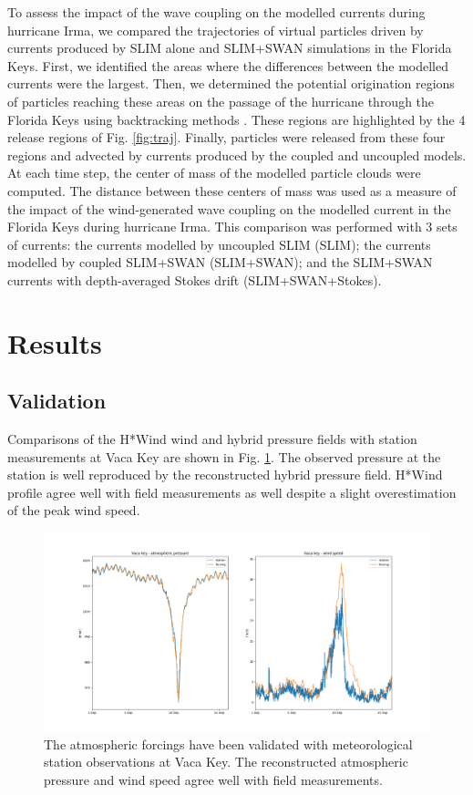 \documentclass[11pt,a4paper]{article}
\begin{document}
To assess the impact of the wave coupling on the modelled currents during hurricane Irma, we compared the trajectories of virtual particles driven by currents produced by SLIM alone and SLIM+SWAN simulations in the Florida Keys. First, we identified the areas where the differences between the modelled currents were the largest. Then, we determined the potential origination regions of particles reaching these areas on the passage of the hurricane through the Florida Keys using backtracking methods \citep{dobbelaerereport}. These regions are highlighted by the 4 release regions of Fig. \ref{fig:traj}. Finally, particles were released from these four regions and advected by currents produced by the coupled and uncoupled models. At each time step, the center of mass of the modelled particle clouds were computed. The distance between these centers of mass was used as a measure of the impact of the wind-generated wave coupling on the modelled current in the Florida Keys during hurricane Irma. This comparison was performed with 3 sets of currents: the currents modelled by uncoupled SLIM (SLIM); the currents modelled by coupled SLIM+SWAN (SLIM+SWAN); and the SLIM+SWAN currents with depth-averaged Stokes drift (SLIM+SWAN+Stokes). 

\section{Results}

\subsection{Validation}

Comparisons of the H*Wind wind and hybrid pressure fields with station measurements at Vaca Key are shown in Fig. \ref{fig:forcings}. The observed pressure at the station is well reproduced by the reconstructed hybrid pressure field. H*Wind profile agree well with field measurements as well despite a slight overestimation of the peak wind speed.

\begin{figure}
    \centering
    \includegraphics[width=.95\textwidth]{fig/validation_met.png}
    \caption{The atmospheric forcings have been validated with meteorological station observations at Vaca Key. The reconstructed atmospheric pressure and wind speed agree well with field measurements.}
    \label{fig:forcings}
\end{figure}
\end{document}
